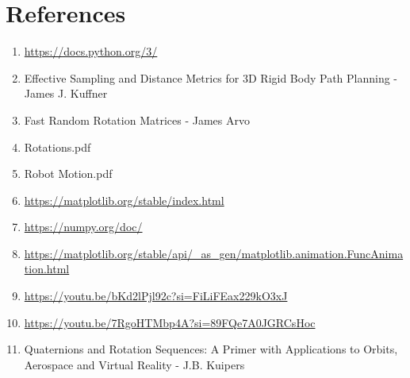 \documentclass[12pt, letterpaper]{article}
\begin{document}
\section{References}
\begin{enumerate}
    \item{\url{https://docs.python.org/3/}}
    \item{Effective Sampling and Distance Metrics for 3D Rigid Body Path Planning - James J. Kuffner}
    \item{Fast Random Rotation Matrices - James Arvo}
    \item{Rotations.pdf}
    \item{Robot Motion.pdf}
    \item{\url{https://matplotlib.org/stable/index.html}}
    \item{\url{https://numpy.org/doc/}}
    \item{\url{https://matplotlib.org/stable/api/_as_gen/matplotlib.animation.FuncAnimation.html}}
    \item{\url{https://youtu.be/bKd2lPjl92c?si=FiLiFEax229kO3xJ}}
    \item{\url{https://youtu.be/7RgoHTMbp4A?si=89FQe7A0JGRCsHoc}}
    \item{Quaternions and Rotation Sequences: A Primer with Applications to Orbits, Aerospace and Virtual Reality - J.B. Kuipers}
\end{enumerate}
\end{document}
